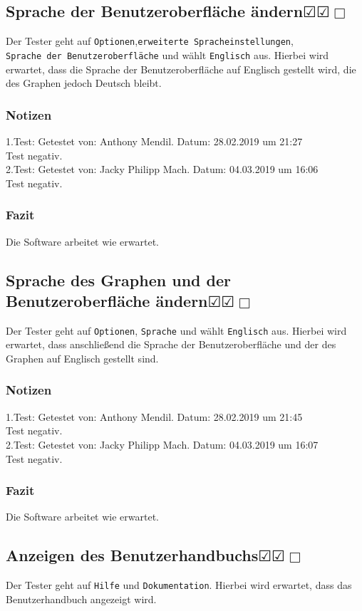 \documentclass[enabledeprecatedfontcommands]{scrartcl}
\newcommand{\subsectiont}[2]{\subsection[#1]{#1{\normalsize\normalfont #2}}}
\newcommand{\leer}{$\Box$}
\newcommand{\ok}{$\CheckedBox$}
\begin{document}
\subsectiont{Sprache der Benutzeroberfläche ändern}{\dotfill\ok\ok\leer}
Der Tester geht auf \texttt{Optionen},\texttt{erweiterte Spracheinstellungen}, \\
\texttt{Sprache der Benutzeroberfläche} und wählt \texttt{Englisch} aus. Hierbei wird erwartet, dass die Sprache der Benutzeroberfläche auf Englisch gestellt wird, die des Graphen jedoch Deutsch bleibt.
\subsubsection{Notizen}
1.Test: Getestet von: Anthony Mendil. Datum: 28.02.2019 um 21:27 \\
Test negativ.\\
2.Test: Getestet von: Jacky Philipp Mach. Datum: 04.03.2019 um 16:06 \\
Test negativ.
\subsubsection{Fazit}
Die Software arbeitet wie erwartet.

\subsectiont{Sprache des Graphen und der Benutzeroberfläche ändern}{\dotfill\ok\ok\leer}
Der Tester geht auf \texttt{Optionen}, \texttt{Sprache} und wählt \texttt{Englisch} aus. Hierbei wird erwartet, dass anschließend die Sprache der Benutzeroberfläche und der des Graphen auf Englisch gestellt sind.
\subsubsection{Notizen}
1.Test: Getestet von: Anthony Mendil. Datum: 28.02.2019 um 21:45 \\
Test negativ.\\
2.Test: Getestet von: Jacky Philipp Mach. Datum: 04.03.2019 um 16:07 \\
Test negativ.
\subsubsection{Fazit}
Die Software arbeitet wie erwartet.

\subsectiont{Anzeigen des Benutzerhandbuchs}{\dotfill\ok\ok\leer}
Der Tester geht auf \texttt{Hilfe} und \texttt{Dokumentation}. Hierbei wird erwartet, dass das Benutzerhandbuch angezeigt wird. 
\end{document}
